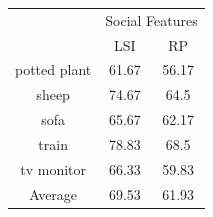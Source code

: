 \begin{table}[!ht]
 \begin{tabular}{|c|c|c|}
  \hline
{\multirow{2}{*}{Labels}} & \multicolumn{2}{|c|}{Social Features} \\ \cline{2-3}
 & LSI & RP \\ \hline
potted plant & 61.67 & 56.17 \\  [1ex] \hline
sheep & 74.67 & 64.5 \\  [1ex] \hline
sofa & 65.67 & 62.17 \\  [1ex] \hline
train & 78.83 & 68.5 \\  [1ex] \hline
tv monitor & 66.33 & 59.83 \\  [1ex] \hline
Average & 69.53 & 61.93 \\  [1ex] \hline
\end{tabular}
 \label{PASCALAccuracySocialFeatures} %
\end{table}

